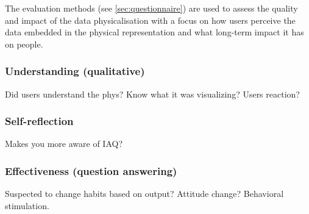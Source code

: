 The evaluation methods (see \ref{sec:questionnaire}) are used to assess the quality and impact of the data physicalisation with a focus on how users perceive the data embedded in the physical representation and what long-term impact it has on people.


\subsubsection{Understanding (qualitative)}

Did users understand the phys? Know what it was visualizing? Users reaction?

\subsubsection{Self-reflection}

Makes you more aware of IAQ?

\subsubsection{Effectiveness (question answering)}

Suspected to change habits based on output? Attitude change? Behavioral stimulation.



